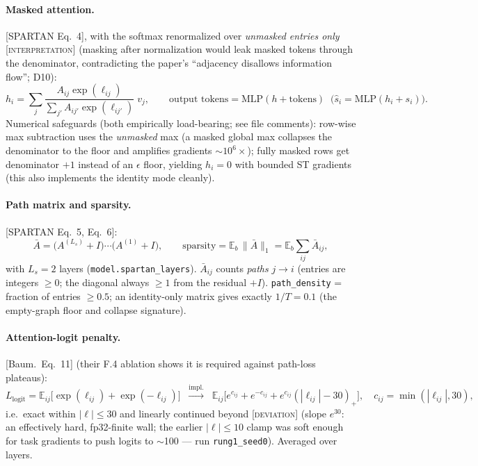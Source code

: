 \documentclass[11pt]{article}
\newcommand{\code}[1]{\texttt{\small #1}}
\newcommand{\paper}[1]{\textcolor{blue!60!black}{[#1]}}
\newcommand{\interp}{\textcolor{orange!80!black}{[\textsc{interpretation}]}}
\newcommand{\dev}{\textcolor{red!70!black}{[\textsc{deviation}]}}
\newcommand{\Abar}{\bar{A}}
\newcommand{\E}{\mathbb{E}}
\begin{document}
\paragraph{Masked attention.} \paper{SPARTAN Eq.~4}, with the softmax renormalized over
\emph{unmasked entries only} \interp{} (masking after normalization would leak masked
tokens through the denominator, contradicting the paper's ``adjacency disallows
information flow''; D10):
\[
  h_i = \sum_j \frac{A_{ij}\exp(\ell_{ij})}{\sum_{j'} A_{ij'}\exp(\ell_{ij'})}\; v_j,
  \qquad
  \text{output tokens} = \mathrm{MLP}(h + \text{tokens}) \;\;\big(\hat s_i = \mathrm{MLP}(h_i + s_i)\big).
\]
Numerical safeguards (both empirically load-bearing; see file comments):
row-wise max subtraction uses the \emph{unmasked} max (a masked global max collapses the
denominator to the floor and amplifies gradients $\sim\!10^6\times$); fully masked rows get
denominator $+1$ instead of an $\epsilon$ floor, yielding $h_i = 0$ with bounded ST
gradients (this also implements the identity mode cleanly).

\paragraph{Path matrix and sparsity.} \paper{SPARTAN Eq.~5, Eq.~6}:
\[
  \Abar = \big(A^{(L_s)} + I\big)\cdots\big(A^{(1)} + I\big),
  \qquad
  \text{sparsity} = \E_b\,\|\Abar\|_1 = \E_b \sum_{ij} \Abar_{ij},
\]
with $L_s = 2$ layers (\code{model.spartan\_layers}). $\Abar_{ij}$ counts \emph{paths}
$j\!\to\!i$ (entries are integers $\ge 0$; the diagonal always $\ge 1$ from the residual
$+I$). \code{path\_density} = fraction of entries $\ge 0.5$; an identity-only matrix gives
exactly $1/T = 0.1$ (the empty-graph floor and collapse signature).

\paragraph{Attention-logit penalty.} \paper{Baum.\ Eq.~11} (their F.4 ablation shows it is
required against path-loss plateaus):
\[
  L_{\mathrm{logit}} = \E_{ij}\big[\exp(\ell_{ij}) + \exp(-\ell_{ij})\big]
  \;\;\xrightarrow{\text{impl.}}\;\;
  \E_{ij}\big[e^{c_{ij}} + e^{-c_{ij}} + e^{c_{ij}}(|\ell_{ij}|-30)_+\big],
  \quad c_{ij} = \min(|\ell_{ij}|,30),
\]
i.e.\ exact within $|\ell|\le 30$ and linearly continued beyond \dev{} (slope $e^{30}$:
an effectively hard, fp32-finite wall; the earlier $|\ell|\le10$ clamp was soft enough for
task gradients to push logits to $\sim$100 --- run \code{rung1\_seed0}). Averaged over
layers.
\end{document}
